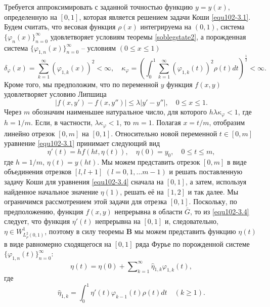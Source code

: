   Требуется аппроксимировать с заданной точностью  функцию $y=y(x)$, определенную на $[0,1]$, которая является решением задачи Коши \eqref{equ102-3.1}.
Будем считать, что весовая функция $\rho(x)$ интегрируема на $(0,1)$, система $\{\varphi_{n}(x)\}_{n=0}^\infty$ удовлетворяет условиям теоремы \ref{soblegstate2}, а порожденная система $\{\varphi_{1,n}(x)\}_{n=0}^\infty$ -- условиям $(0\le x\le 1)$
\begin{equation}\label{equ102-3.2}
\delta_\varphi(x)=\sum_{k=1}^{\infty}(\varphi_{1,k}(x))^2<\infty,\quad
\kappa_{\varphi}=\left(\int_0^1\sum_{k=1}^{\infty}
(\varphi_{1,k}(t))^2\rho(t)dt\right)^{\frac12}<\infty.
\end{equation}
Кроме того, мы предположим, что по переменной $y$ функция $f(x,y)$ удовлетворяет условию Липшица
 \begin{equation}\label{equ102-3.3}
|f(x,y')-f(x,y'')|\le \lambda|y'-y''|, \quad 0\le x \le 1.
\end{equation}
Через $m$ обозначим наименьшее натуральное число, для которого $h\lambda\kappa_\varphi<1$, где $h=1/m$. Если, в частности, $\lambda\kappa_\varphi<1$, то $m=1$. Полагая $x=t/m$, отобразим линейно отрезок $[0,m]$ на $[0,1]$. Относительно новой переменной $t\in [0,m]$ уравнение \eqref{equ102-3.1} принимает следующий вид
\begin{equation}\label{equ102-3.4}
\eta'(t)=hf(ht,\eta(t)), \quad \eta(0)=y_0,\quad 0\le t\le m,
\end{equation}
где $h=1/m$, $\eta(t)=y(ht)$. Мы можем представить отрезок $[0,m]$ в виде объединения отрезков $[l,l+1]$ $(l=0,1,\ldots m-1)$ и  решать поставленную задачу Коши для уравнения \eqref{equ102-3.4} сначала на $[0,1]$, а затем, используя найденное начальное значение $\eta(1)$,  решать её на $[1,2]$ и так далее. Мы ограничимся рассмотрением этой задачи для отрезка $[0,1]$. Поскольку, по предположению, функция $f(x,y)$ непрерывна в области $\bar G$, то из \eqref{equ102-3.4} следует, что  функция $\eta'(t)$ непрерывна на $[0,1]$ и, следовательно, $\eta\in W_{L_\rho^2(0,1)}^1$, поэтому в силу теоремы \textbf{ B}  мы можем представить  функцию $\eta(t)$ в виде равномерно сходящегося на $[0,1]$ ряда Фурье по порожденной системе $\{\varphi_{1,n}(t)\}_{n=0}^\infty$:
\begin{equation}\label{equ102-3.5}
\eta(t)= \eta(0)+ \sum\nolimits_{k=1}^\infty \hat \eta_{1,k}\varphi_{1,k}(t),
\end{equation}
где
  \begin{equation}\label{equ102-3.6}
\hat \eta_{1,k}=\int_{0}^1 \eta'(t)\varphi_{k-1}(t)\rho(t)dt\quad(k\ge1).
\end{equation}
